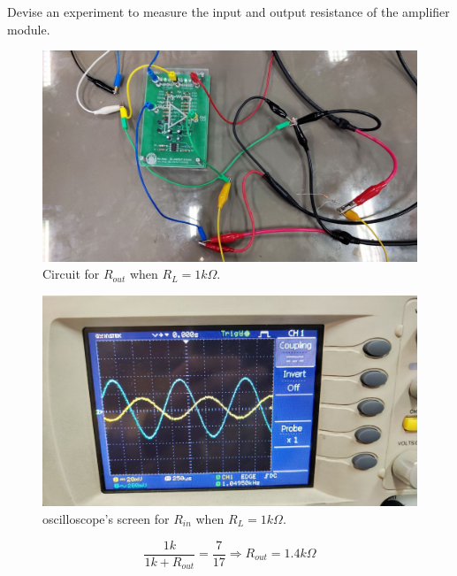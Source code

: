 \documentclass[11pt]{article}
\newcommand{\PicScale}{0.2}
\begin{document}
\begin{question}
\begin{subquestion}{Devise an experiment to measure the input and output resistance of the amplifier module.}
{\begin{figure}[H]
                \centering
                \includegraphics[scale=\PicScale,angle=0]{Fig/42.jpeg}
                \caption{Circuit for $R_{out}$ when $R_L = 1k\Omega$.}
            \end{figure}
            \begin{figure}[H]
                \centering
                \includegraphics[scale=\PicScale,angle=0]{Fig/43.jpeg}
                \caption{oscilloscope's screen for $R_{in}$ when $R_L = 1k\Omega$.}
            \end{figure}
            \[
                \frac{1k}{1k + R_{out}} = \frac{7}{17} \Rightarrow R_{out} = 1.4k\Omega
            \]
        }
    \end{subquestion}


\end{question}
\end{document}
